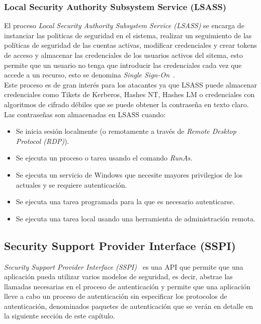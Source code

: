 \subsubsection{Local Security Authority Subsystem Service (LSASS)}

El proceso {\it Local Security Authority Subsystem Service (LSASS)} se encarga de instanciar las politicas de seguridad en el sistema, realizar un seguimiento de las políticas de seguridad de las cuentas activas, modificar credenciales y crear tokens de acceso y almacenar las credenciales de los usuarios activos del sitema, esto permite que un usuario no tenga que introducir las credenciales cada vez que accede a un recurso, esto se denomina {\it Single Sign-On}~\cite{Capitulo2:SingleSignOn}.\\

Este proceso es de gran interés para los atacantes ya que LSASS puede almacenar credenciales como Tikets de Kerberos, Hashes NT, Hashes LM o credenciales con algoritmos de cifrado débiles que se puede obtener la contraseña en texto claro.\\

Las contraseñas son almacenadas en LSASS cuando:

\begin{itemize}
\item Se inicia sesión localmente (o remotamente a través de {\it Remote Desktop Protocol (RDP)}). 
\item Se ejecuta un proceso o tarea usando el comando {\it RunAs}.
\item Se ejecuta un servicio de Windows que necesite mayores privilegios de los actuales y se requiere autenticación.
\item Se ejecuta una tarea programada para la que es necesario autenticarse. 
\item Se ejecuta una tarea local usando una herramienta de administración remota. 
\end{itemize}


\subsection{Security Support Provider Interface (SSPI)}

{\it Security Support Provider Interface (SSPI)}~\cite{Capitulo2:SSPI} es una API que permite que una aplicación pueda utilizar varios modelos de seguridad, es decir, abstrae las llamadas necesarias en el proceso de autenticación y permite que una aplicación lleve a cabo un proceso de autenticación sin especificar los protocolos de autenticación, denominados paquetes de autenticación que se verán en detalle en la siguiente sección de este capítulo.\\

